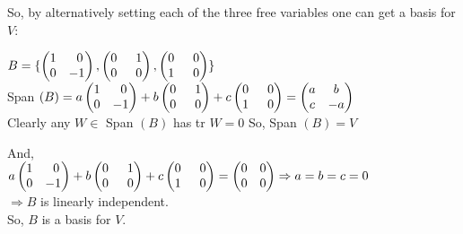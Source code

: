 \documentclass{article}
\begin{document}
So, by alternatively setting each of the three free variables one can get a
basis for $V$:\vspace{1.618 mm}

$B =\{\begin{pmatrix}
1&\enskip0\\
0&-1
\end{pmatrix},\begin{pmatrix}
0&\enskip1\\
0&\enskip0
\end{pmatrix},\begin{pmatrix}
0&\enskip0\\
1&\enskip0
\end{pmatrix}\}$\\


Span $(B) = a\begin{pmatrix}
1&\enskip0\\
0&-1
\end{pmatrix}
+ b\begin{pmatrix}
0&\enskip1\\
0&\enskip0
\end{pmatrix}
+c\begin{pmatrix}
0&\enskip0\\
1&\enskip0
\end{pmatrix} =
\begin{pmatrix}
a&b\\
c&-a
\end{pmatrix}$\\

Clearly any $W \in$ Span $(B)$ has tr $W = 0$
So, Span $(B) = V$

And,\\

$a\begin{pmatrix}
1&\enskip0\\
0&-1
\end{pmatrix}
+ b\begin{pmatrix}
0&\enskip1\\
0&\enskip0
\end{pmatrix}
+c\begin{pmatrix}
0&\enskip0\\
1&\enskip0
\end{pmatrix} =
\begin{pmatrix}
0&0\\
0&0
\end{pmatrix} \Rightarrow a = b =c = 0$\\

$\Rightarrow B$ is linearly independent.\\
So, $B$ is a basis for $V$.\\
\end{document}
